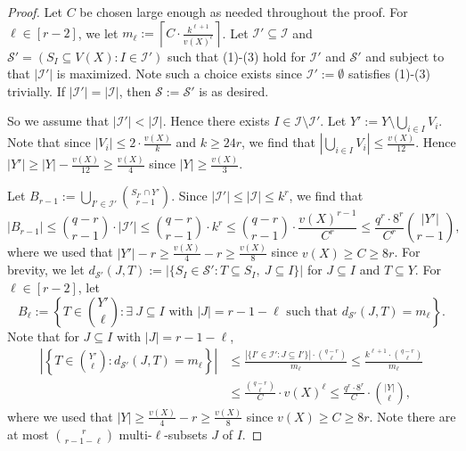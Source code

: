 \documentclass[11pt]{article}
\newcounter{i}
\theoremstyle{plain}
\theoremstyle{plain} %
\theoremstyle{definition}
\begin{document}
\begin{proof}
Let $C$ be chosen large enough as needed throughout the proof. For $\ell\in [r-2]$, we let $m_{\ell}:= \left\lceil C\cdot \frac{k^{\ell+1}}{v(X)^{\ell}} \right\rceil$. Let $\mathcal{I}'\subseteq \mathcal{I}$ and $\mathcal{S}' = (S_I\subseteq V(X): I \in \mathcal{I}')$ such that (1)-(3) hold for $\mathcal{I}'$ and $\mathcal{S'}$ and subject to that $|\mathcal{I}'|$ is maximized. Note such a choice exists since $\mathcal{I}':=\emptyset$ satisfies (1)-(3) trivially. If $|\mathcal{I}'|=|\mathcal{I}|$, then $\mathcal{S}:=\mathcal{S}'$ is as desired.

So we assume that $|\mathcal{I}'| < |\mathcal{I}|$. Hence there exists $I\in \mathcal{I}\setminus \mathcal{I}'$. Let $Y':= Y\setminus \bigcup_{i\in I} V_i$. Note that since $|V_i| \le 2\cdot \frac{v(X)}{k}$ and $k\ge 24r$, we find that $|\bigcup_{i\in I} V_i|\le \frac{v(X)}{12}$. Hence $|Y'|\ge |Y|-\frac{v(X)}{12} \ge \frac{v(X)}{4}$ since $|Y|\ge \frac{v(X)}{3}$. 

Let $B_{r-1} := \bigcup_{I'\in \mathcal{I}'} \binom{S_{I'}\cap Y'}{r-1}$. Since $|\mathcal{I}'| \le |\mathcal{I}|\le k^r$, we find that 
$$|B_{r-1}| \le \binom{q-r}{r-1} \cdot |\mathcal{I}'| \le \binom{q-r}{r-1}\cdot k^r \le \binom{q-r}{r-1} \cdot \frac{v(X)^{r-1}}{C^r} \le \frac{q^r\cdot 8^r}{C^r} \binom{|Y'|}{r-1},$$
where we used that $|Y'|-r\ge \frac{v(X)}{4} - r \ge \frac{v(X)}{8}$ since $v(X)\ge C \ge 8r$. For brevity, we let $d_{\mathcal{S}'}(J,T):= |\{S_I \in \mathcal{S}': T\subseteq S_I,~J\subseteq I\}|$ for $J\subseteq I$ and $T\subseteq Y$. For $\ell \in [r-2]$, let
$$B_{\ell} := \left\{ T\in \binom{Y'}{\ell}: \exists~J \subseteq I \text{ with } |J|=r-1-\ell \text{ such that } d_{\mathcal{S}'}(J,T) = m_{\ell} \right\}.$$
Note that for $J\subseteq I$ with $|J|=r-1-\ell$,
\begin{align*}
\left|\left\{ T\in \binom{Y'}{\ell}: d_{\mathcal{S}'}(J,T)= m_{\ell}\right\}\right| &\le \frac{|\{I' \in \mathcal{I}': J\subseteq I'\}| \cdot \binom{q-r}{\ell}}{m_{\ell}} \le \frac{k^{\ell+1}\cdot \binom{q-r}{\ell}}{m_{\ell}} \\
&\le \frac{\binom{q-r}{\ell}}{C} \cdot v(X)^{\ell} \le \frac{q^r\cdot 8^r}{C}\cdot \binom{|Y|}{\ell},
\end{align*}
where we used that $|Y|\ge \frac{v(X)}{4}-r\ge \frac{v(X)}{8}$ since $v(X)\ge C \ge 8r$. Note there are at most $\binom{r}{r-1-\ell}$ multi-$\ell$-subsets $J$ of $I$. 


\end{proof}
\end{document}
